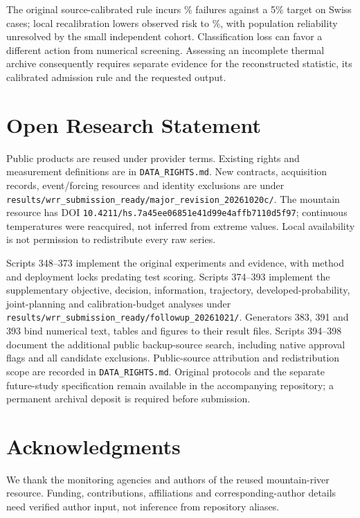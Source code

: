 The original source-calibrated rule incurs \RTestRetFrozenRisk{}\% failures against a 5\% target on \RTestRetCases{} Swiss cases; local recalibration lowers observed risk to \RTestRetRecalibratedRisk{}\%, with population reliability unresolved by the small independent cohort. Classification loss can favor a different action from numerical screening. Assessing an incomplete thermal archive consequently requires separate evidence for the reconstructed statistic, its calibrated admission rule and the requested output.

\section*{Open Research Statement}

Public products are reused under provider terms. Existing rights and measurement definitions are in \texttt{DATA\_RIGHTS.md}. New contracts, acquisition records, event/forcing resources and identity exclusions are under \texttt{results/wrr\_submission\_ready/major\_revision\_20261020c/}. The mountain resource has DOI \texttt{10.4211/hs.7a45ee06851e41d99e4affb7110d5f97}; continuous temperatures were reacquired, not inferred from extreme values. Local availability is not permission to redistribute every raw series.

Scripts 348--373 implement the original experiments and evidence, with method and deployment locks predating test scoring. Scripts 374--393 implement the supplementary objective, decision, information, trajectory, developed-probability, joint-planning and calibration-budget analyses under \texttt{results/wrr\_submission\_ready/followup\_20261021/}. Generators 383, 391 and 393 bind numerical text, tables and figures to their result files. Scripts 394--398 document the additional public backup-source search, including native approval flags and all candidate exclusions. Public-source attribution and redistribution scope are recorded in \texttt{DATA\_RIGHTS.md}. Original protocols and the separate future-study specification remain available in the accompanying repository; a permanent archival deposit is required before submission.

\section*{Acknowledgments}
We thank the monitoring agencies and authors of the reused mountain-river resource. Funding, contributions, affiliations and corresponding-author details need verified author input, not inference from repository aliases.

